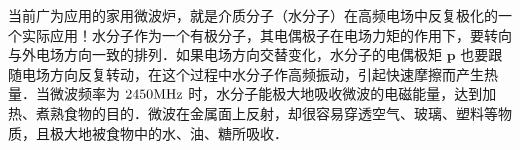 当前广为应用的家用微波炉，就是介质分子（水分子）在高频电场中反复极化的一个实际应用！水分子作为一个有极分子，其电偶极子在电场力矩的作用下，要转向与外电场方向一致的排列．如果电场方向交替变化，水分子的电偶极矩 $\mathbf p$ 也要跟随电场方向反复转动，在这个过程中水分子作高频振动，引起快速摩擦而产生热量．当微波频率为 $2450\rm  MHz$ 时，水分子能极大地吸收微波的电磁能量，达到加热、煮熟食物的目的．微波在金属面上反射，却很容易穿透空气、玻璃、塑料等物质，且极大地被食物中的水、油、糖所吸收．

